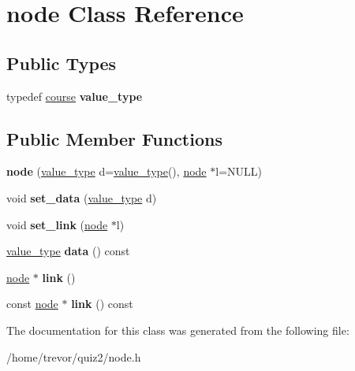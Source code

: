 \hypertarget{classnode}{}\section{node Class Reference}
\label{classnode}
\subsection*{Public Types}
\begin{DoxyCompactItemize}
\item 
typedef \hyperlink{classcourse}{course} {\bfseries value\+\_\+type}\hypertarget{classnode_af79958a8234d1a3d642adf6637cb9f9b}{}\label{classnode_af79958a8234d1a3d642adf6637cb9f9b}

\end{DoxyCompactItemize}
\subsection*{Public Member Functions}
\begin{DoxyCompactItemize}
\item 
{\bfseries node} (\hyperlink{classcourse}{value\+\_\+type} d=\hyperlink{classcourse}{value\+\_\+type}(), \hyperlink{classnode}{node} $\ast$l=N\+U\+LL)\hypertarget{classnode_a4d89d50fbee6842a2588ef0c07063cb8}{}\label{classnode_a4d89d50fbee6842a2588ef0c07063cb8}

\item 
void {\bfseries set\+\_\+data} (\hyperlink{classcourse}{value\+\_\+type} d)\hypertarget{classnode_ac9906af97ebcd35ffa46145f865eed6c}{}\label{classnode_ac9906af97ebcd35ffa46145f865eed6c}

\item 
void {\bfseries set\+\_\+link} (\hyperlink{classnode}{node} $\ast$l)\hypertarget{classnode_ae9887204ac73c954e3a4da3fa15c9df9}{}\label{classnode_ae9887204ac73c954e3a4da3fa15c9df9}

\item 
\hyperlink{classcourse}{value\+\_\+type} {\bfseries data} () const \hypertarget{classnode_a9c9e0f956de2f1b27d2b3d89f1021472}{}\label{classnode_a9c9e0f956de2f1b27d2b3d89f1021472}

\item 
\hyperlink{classnode}{node} $\ast$ {\bfseries link} ()\hypertarget{classnode_a3871737751cf0fd295a07c77d0c72f82}{}\label{classnode_a3871737751cf0fd295a07c77d0c72f82}

\item 
const \hyperlink{classnode}{node} $\ast$ {\bfseries link} () const \hypertarget{classnode_a9fcc39fcb8cab3d2c75d24955054f806}{}\label{classnode_a9fcc39fcb8cab3d2c75d24955054f806}

\end{DoxyCompactItemize}


The documentation for this class was generated from the following file\+:\begin{DoxyCompactItemize}
\item 
/home/trevor/quiz2/node.\+h\end{DoxyCompactItemize}

